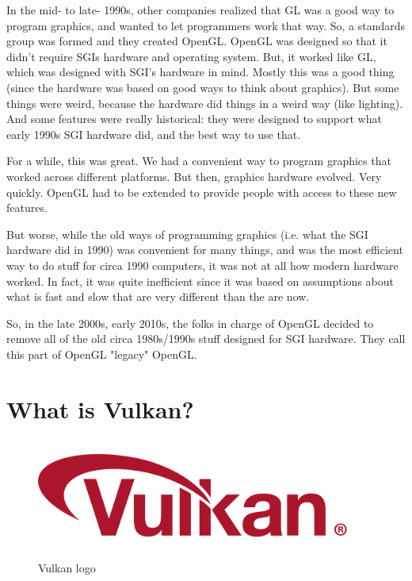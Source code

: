In the mid- to late- 1990s, other companies realized that GL was a good
way to program graphics, and wanted to let programmers work that way.
So, a standards group was formed and they created OpenGL. OpenGL was designed
so that it didn't require SGIs hardware and operating system. But, it worked
like GL, which was designed with SGI's hardware in mind. Mostly this was a
good thing (since the hardware was based on good ways to think about graphics).
But some things were weird, because the hardware did things in a
weird way (like lighting). And some features were really historical: they were
designed to support what early 1990s SGI hardware did, and the best way to use that.

For a while, this was great. We had a convenient way to program graphics
that worked across different platforms.
But then, graphics hardware evolved. Very quickly. OpenGL had to be extended
to provide people with access to these new features.

But worse, while the old ways of programming graphics (i.e. what the SGI
hardware did in 1990) was convenient for many things, and was the most efficient
way to do stuff for circa 1990 computers, it was not at all how modern hardware
worked. In fact, it was quite inefficient since it was based on assumptions
about what is fast and slow that are very different than the are now.

So, in the late 2000s, early 2010s, the folks in charge of OpenGL decided to
remove all of the old circa 1980s/1990s stuff designed for SGI hardware.
They call this part of OpenGL "legacy" OpenGL.

\section{What is Vulkan?}

\begin{figure}
    \begin{center}
        \includegraphics[scale=0.10]{images/ChVulkan/VulkanLogo.png}
    \end{center}
    \caption{Vulkan logo}
    \label{fig:VulkanLogo}
\end{figure}

